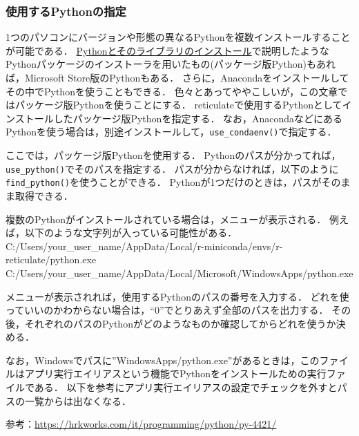 \documentclass[
]{article}
\begin{document}
\hypertarget{identify_python}{%
\subsubsection{使用するPythonの指定}\label{identify_python}}

1つのパソコンにバージョンや形態の異なるPythonを複数インストールすることが可能である．
\protect\hyperlink{install_python}{Pythonとそのライブラリのインストール}で説明したようなPythonパッケージのインストーラを用いたもの(パッケージ版Python)もあれば，Microsoft Store版のPythonもある．
さらに，Anacondaをインストールしてその中でPythonを使うこともできる．
色々とあってややこしいが，この文章ではパッケージ版Pythonを使うことにする．
reticulateで使用するPythonとしてインストールしたパッケージ版Pythonを指定する．
なお，AnacondaなどにあるPythonを使う場合は，別途インストールして，\texttt{use\_condaenv()}で指定する．

ここでは，パッケージ版Pythonを使用する．
Pythonのパスが分かってれば，\texttt{use\_python()}でそのパスを指定する．
パスが分からなければ，以下のように\texttt{find\_python()}を使うことができる．
Pythonが1つだけのときは，パスがそのまま取得できる．

複数のPythonがインストールされている場合は，メニューが表示される．
例えば，以下のような文字列が入っている可能性がある．
C:/Users/your\_user\_name/AppData/Local/r-miniconda/envs/r-reticulate/python.exe
C:/Users/your\_user\_name/AppData/Local/Microsoft/WindowsApps/python.exe

メニューが表示されれば，使用するPythonのパスの番号を入力する．
どれを使っていいのかわからない場合は，``0''でとりあえず全部のパスを出力する．
その後，それぞれのパスのPythonがどのようなものか確認してからどれを使うか決める．

なお，Windowsでパスに''WindowsApps/python.exe''があるときは，このファイルはアプリ実行エイリアスという機能でPythonをインストールための実行ファイルである．
以下を参考にアプリ実行エイリアスの設定でチェックを外すとパスの一覧からは出なくなる．

参考：\url{https://hrkworks.com/it/programming/python/py-4421/}
\end{document}
